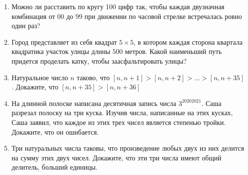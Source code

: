\documentclass{article}
\begin{document}
\begin{enumerate}[label*=\protect\fbox{\arabic{enumi}}]
\item Можно ли расставить по кругу 100 цифр так, чтобы каждая двузначная комбинация от 00 до 99 при движении по часовой стрелке встречалась ровно один раз?

\item Город представляет из себя квадрат $5 \times 5$, в котором каждая сторона квартала квадратика участок улицы длины $500$ метров. Какой наименьший путь придется проделать катку, чтобы заасфальтировать улицы?

\item Натуральное число $n$ таково, что
$[n, n + 1] > [n, n + 2] > \dotsc > [n, n + 35]$.
Докажите, что $[n, n + 35] >[n, n + 36]$

\item На длинной полоске написана десятичная запись числа $3^{20202021}$. Саша разрезал полоску на три куска. Изучив числа, написанные на этих кусках, Саша заявил, что каждое из этих трех чисел является степенью тройки. Докажите, что он ошибается.

\item Три натуральных числа таковы, что произведение любых двух из них делится на сумму этих двух чисел. Докажите, что эти три числа имеют общий делитель, больший единицы.


\end{enumerate}
\end{document}
